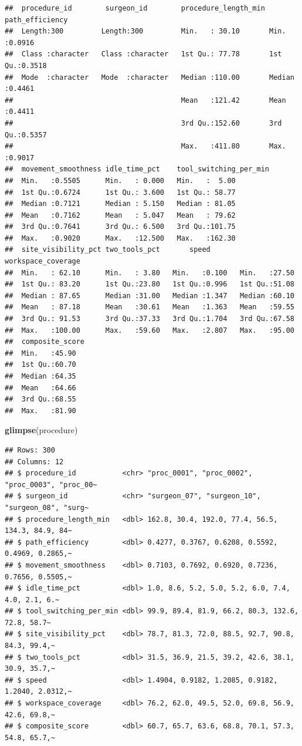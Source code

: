 \documentclass[
]{article}
\newenvironment{Shaded}{\begin{snugshade}}{\end{snugshade}}
\newcommand{\FunctionTok}[1]{\textcolor[rgb]{0.13,0.29,0.53}{\textbf{#1}}}
\newcommand{\NormalTok}[1]{#1}
\begin{document}
\begin{verbatim}
##  procedure_id        surgeon_id        procedure_length_min path_efficiency 
##  Length:300         Length:300         Min.   : 30.10       Min.   :0.0916  
##  Class :character   Class :character   1st Qu.: 77.78       1st Qu.:0.3518  
##  Mode  :character   Mode  :character   Median :110.00       Median :0.4461  
##                                        Mean   :121.42       Mean   :0.4411  
##                                        3rd Qu.:152.60       3rd Qu.:0.5357  
##                                        Max.   :411.80       Max.   :0.9017  
##  movement_smoothness idle_time_pct    tool_switching_per_min
##  Min.   :0.5505      Min.   : 0.000   Min.   :  5.00        
##  1st Qu.:0.6724      1st Qu.: 3.600   1st Qu.: 58.77        
##  Median :0.7121      Median : 5.150   Median : 81.05        
##  Mean   :0.7162      Mean   : 5.047   Mean   : 79.62        
##  3rd Qu.:0.7641      3rd Qu.: 6.500   3rd Qu.:101.75        
##  Max.   :0.9020      Max.   :12.500   Max.   :162.30        
##  site_visibility_pct two_tools_pct       speed       workspace_coverage
##  Min.   : 62.10      Min.   : 3.80   Min.   :0.100   Min.   :27.50     
##  1st Qu.: 83.20      1st Qu.:23.80   1st Qu.:0.996   1st Qu.:51.08     
##  Median : 87.65      Median :31.00   Median :1.347   Median :60.10     
##  Mean   : 87.18      Mean   :30.61   Mean   :1.363   Mean   :59.55     
##  3rd Qu.: 91.53      3rd Qu.:37.33   3rd Qu.:1.704   3rd Qu.:67.58     
##  Max.   :100.00      Max.   :59.60   Max.   :2.807   Max.   :95.00     
##  composite_score
##  Min.   :45.90  
##  1st Qu.:60.70  
##  Median :64.35  
##  Mean   :64.66  
##  3rd Qu.:68.55  
##  Max.   :81.90
\end{verbatim}

\begin{Shaded}
\begin{Highlighting}[]
\FunctionTok{glimpse}\NormalTok{(procedure)}
\end{Highlighting}
\end{Shaded}

\begin{verbatim}
## Rows: 300
## Columns: 12
## $ procedure_id           <chr> "proc_0001", "proc_0002", "proc_0003", "proc_00~
## $ surgeon_id             <chr> "surgeon_07", "surgeon_10", "surgeon_08", "surg~
## $ procedure_length_min   <dbl> 162.8, 30.4, 192.0, 77.4, 56.5, 134.3, 84.9, 84~
## $ path_efficiency        <dbl> 0.4277, 0.3767, 0.6208, 0.5592, 0.4969, 0.2865,~
## $ movement_smoothness    <dbl> 0.7103, 0.7692, 0.6920, 0.7236, 0.7656, 0.5505,~
## $ idle_time_pct          <dbl> 1.0, 8.6, 5.2, 5.0, 5.2, 6.0, 7.4, 4.0, 2.1, 6.~
## $ tool_switching_per_min <dbl> 99.9, 89.4, 81.9, 66.2, 80.3, 132.6, 72.8, 58.7~
## $ site_visibility_pct    <dbl> 78.7, 81.3, 72.0, 88.5, 92.7, 90.8, 84.3, 99.4,~
## $ two_tools_pct          <dbl> 31.5, 36.9, 21.5, 39.2, 42.6, 38.1, 30.9, 35.7,~
## $ speed                  <dbl> 1.4904, 0.9182, 1.2085, 0.9182, 1.2040, 2.0312,~
## $ workspace_coverage     <dbl> 76.2, 62.0, 49.5, 52.0, 69.8, 56.9, 42.6, 69.8,~
## $ composite_score        <dbl> 60.7, 65.7, 63.6, 68.8, 70.1, 57.3, 54.8, 65.7,~
\end{verbatim}
\end{document}
